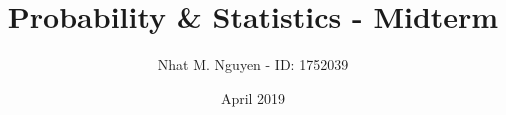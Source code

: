 \documentclass[9pt, landscape, a4paper]{article}
\title{\vspace{-4ex}\Large{Probability \& Statistics - Midterm}}
\author{Nhat M. Nguyen - ID: 1752039}
\date{April 2019}
\begin{document}
  \maketitle

  \begin{multicols}{2}
    \tableofcontents
  \end{multicols}

  \clearpage

  
  
  
  
\end{document}
